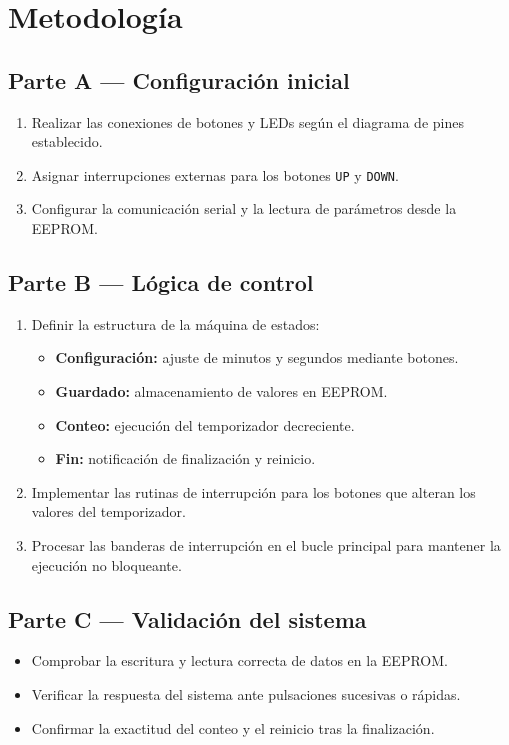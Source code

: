 \documentclass[12pt]{article}
\begin{document}

	\section{Metodología}
	
	\subsection{Parte A — Configuración inicial}
	\begin{enumerate}
		\item Realizar las conexiones de botones y LEDs según el diagrama de pines establecido.
		\item Asignar interrupciones externas para los botones \texttt{UP} y \texttt{DOWN}.
		\item Configurar la comunicación serial y la lectura de parámetros desde la EEPROM.
	\end{enumerate}
	
	\subsection{Parte B — Lógica de control}
	\begin{enumerate}
		\item Definir la estructura de la máquina de estados:
		\begin{itemize}
			\item \textbf{Configuración:} ajuste de minutos y segundos mediante botones.
			\item \textbf{Guardado:} almacenamiento de valores en EEPROM.
			\item \textbf{Conteo:} ejecución del temporizador decreciente.
			\item \textbf{Fin:} notificación de finalización y reinicio.
		\end{itemize}
		\item Implementar las rutinas de interrupción para los botones que alteran los valores del temporizador.
		\item Procesar las banderas de interrupción en el bucle principal para mantener la ejecución no bloqueante.
	\end{enumerate}
	
	\subsection{Parte C — Validación del sistema}
	\begin{itemize}
		\item Comprobar la escritura y lectura correcta de datos en la EEPROM.
		\item Verificar la respuesta del sistema ante pulsaciones sucesivas o rápidas.
		\item Confirmar la exactitud del conteo y el reinicio tras la finalización.
	\end{itemize}
	
\end{document}
